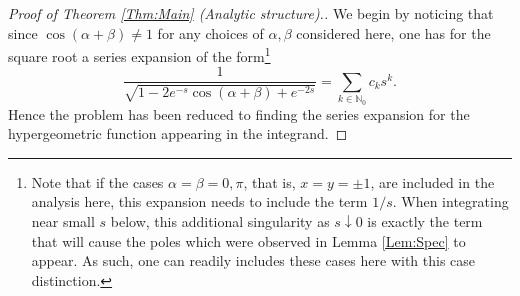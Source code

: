 \documentclass[letterpaper,10pt]{amsart}
\numberwithin{equation}{section}
\begin{document}
\begin{proof}[Proof of Theorem \ref{Thm:Main} (Analytic structure).]
We begin by noticing that since $\cos(\alpha+\beta)\neq1$ for any choices of $\alpha,\beta$ considered here, one has for the square root a series expansion of the form\footnote{Note that if the cases $\alpha=\beta=0,\pi$, that is, $x=y=\pm1$, are included in the analysis here, this expansion needs to include the term $1/s$. When integrating near small $s$ below, this additional singularity as $s\downarrow0$ is exactly the term that will cause the poles which were observed in Lemma \ref{Lem:Spec} to appear. As such, one can readily includes these cases here with this case distinction.}
\begin{equation}\label{Eq:squareroot}
\frac{1}{\sqrt{1-2e^{-s}\cos(\alpha+\beta)+e^{-2s}}}=\sum_{k\in\mathbb{N}_0}c_ks^k.
\end{equation}
Hence the problem has been reduced to finding the series expansion for the hypergeometric function appearing in the integrand.


\end{proof}
\end{document}
